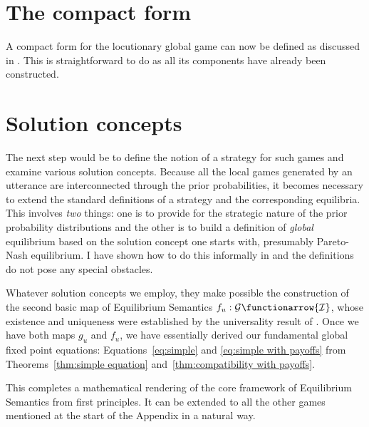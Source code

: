
\section{The compact form}\label{sec:A.6}


A compact form for the locutionary global game can now be defined as discussed in . This is straightforward to do as all its components have already been constructed.


\section{Solution concepts}\label{sec:A.7}

The next step would be to define the notion of a strategy for such games and examine various solution concepts. Because all the local games generated by an utterance are interconnected through the prior probabilities, it becomes necessary to extend the standard definitions of a strategy and the corresponding equilibria. This involves \emph{two} things: one is to provide for the strategic nature of the prior probability distributions and the other is to build a definition of \emph{global} equilibrium based on the solution concept one starts with, presumably Pareto-Nash equilibrium. I have shown how to do this informally in  and the definitions do not pose any special obstacles.

Whatever solution concepts we employ, they make possible the construction of the second basic map of Equilibrium Semantics $f_u: {\cal G} \functionarrow {\cal I}$, whose existence and uniqueness were established by the universality result of . Once we have both maps $g_u$ and $f_u$, we have essentially derived our fundamental global fixed point equations: Equations~\ref{eq:simple} and \ref{eq:simple with payoffs} from Theorems~\ref{thm:simple equation} and~\ref{thm:compatibility with payoffs}.

This completes a mathematical rendering of the core framework of Equilibrium Semantics from first principles. It can be extended to all the other games mentioned at the start of the Appendix in a natural way.
